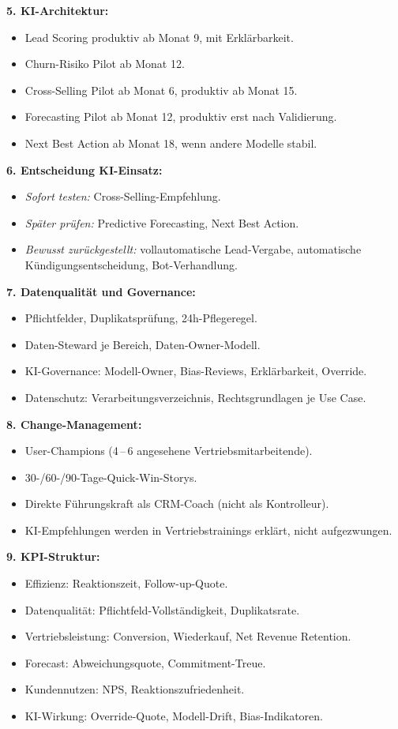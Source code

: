 \documentclass[11pt,a4paper,oneside]{article}
\begin{document}
\begin{loesungbox}
\textbf{5. KI-Architektur:}
\begin{itemize}
  \item Lead Scoring \textrightarrow{} produktiv ab Monat 9, mit Erklärbarkeit.
  \item Churn-Risiko \textrightarrow{} Pilot ab Monat 12.
  \item Cross-Selling \textrightarrow{} Pilot ab Monat 6, produktiv ab Monat 15.
  \item Forecasting \textrightarrow{} Pilot ab Monat 12, produktiv erst nach Validierung.
  \item Next Best Action \textrightarrow{} ab Monat 18, wenn andere Modelle stabil.
\end{itemize}

\textbf{6. Entscheidung KI-Einsatz:}
\begin{itemize}
  \item \emph{Sofort testen:} Cross-Selling-Empfehlung.
  \item \emph{Später prüfen:} Predictive Forecasting, Next Best Action.
  \item \emph{Bewusst zurückgestellt:} vollautomatische Lead-Vergabe, automatische Kündigungsentscheidung, Bot-Verhandlung.
\end{itemize}

\textbf{7. Datenqualität und Governance:}
\begin{itemize}
  \item Pflichtfelder, Duplikatsprüfung, 24h-Pflegeregel.
  \item Daten-Steward je Bereich, Daten-Owner-Modell.
  \item KI-Governance: Modell-Owner, Bias-Reviews, Erklärbarkeit, Override.
  \item Datenschutz: Verarbeitungsverzeichnis, Rechtsgrundlagen je Use Case.
\end{itemize}

\textbf{8. Change-Management:}
\begin{itemize}
  \item User-Champions (4\,--\,6 angesehene Vertriebsmitarbeitende).
  \item 30-/60-/90-Tage-Quick-Win-Storys.
  \item Direkte Führungskraft als CRM-Coach (nicht als Kontrolleur).
  \item KI-Empfehlungen werden in Vertriebstrainings erklärt, nicht aufgezwungen.
\end{itemize}

\textbf{9. KPI-Struktur:}
\begin{itemize}
  \item Effizienz: Reaktionszeit, Follow-up-Quote.
  \item Datenqualität: Pflichtfeld-Vollständigkeit, Duplikatsrate.
  \item Vertriebsleistung: Conversion, Wiederkauf, Net Revenue Retention.
  \item Forecast: Abweichungsquote, Commitment-Treue.
  \item Kundennutzen: NPS, Reaktionszufriedenheit.
  \item KI-Wirkung: Override-Quote, Modell-Drift, Bias-Indikatoren.
\end{itemize}


\end{loesungbox}
\end{document}

